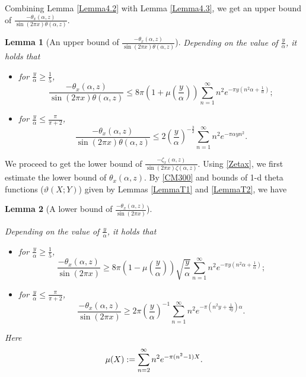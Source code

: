 \documentclass[reqno,english]{amsart}
\newtheorem{lemma}{Lemma}[section]
\newtheorem{open problem}{Open Problem}[section]
\newtheorem{open question}{Open Question}[section]
\newtheorem{open questions on hexagonal lattice}{Open Questions on hexagonal lattice}[section]
\begin{document}
Combining Lemma \ref{Lemma4.2} with Lemma \ref{Lemma4.3}, we get an upper bound of $\frac{-\theta_x(\alpha,z)}{\sin(2\pi x)\theta(\alpha,z)}$.
\begin{lemma}[An upper bound of $\frac{-\theta_x(\alpha,z)}{\sin(2\pi x)\theta(\alpha,z)}$]
\label{Lemma44KKK}
Depending on the value of $\frac{y}{\alpha}$, it holds that

\begin{itemize}
  \item for $\frac{y}{\alpha}\geq\frac{1}{5}$, $$\frac{-\theta_x(\alpha,z)}{\sin(2\pi x)\theta(\alpha,z)}\leq
8\pi(1+\mu(\frac{y}{\alpha}))\sum_{n=1}^\infty n^2 e^{-\pi y (n^2 \alpha+\frac{1}{\alpha})};$$
  \item for $\frac{y}{\alpha}\leq\frac{\pi}{\pi+2}$, $$\frac{-\theta_x(\alpha,z)}{\sin(2\pi x)\theta(\alpha,z)}\leq2(\frac{y}{\alpha})^{-\frac{3}{2}}\sum_{n=1}^\infty n^2 e^{-\pi\alpha y n^2}.$$
\end{itemize}




\end{lemma}

We proceed to get the lower bound of $\frac{-\zeta_x(\alpha,z)}{\sin(2\pi x)\zeta(\alpha,z)}$. Using \eqref{Zetax}, we first estimate the lower bound of $\theta_x(\alpha,z)$. By \eqref{CM300} and bounds of 1-d theta functions ($\vartheta(X;Y)$) given by Lemmas \ref{LemmaT1} and \ref{LemmaT2}, we have
\begin{lemma}[A lower bound of $\frac{-\theta_x(\alpha,z)}{\sin(2\pi x)}$]\label{Lemma43}

Depending on the value of $\frac{y}{\alpha}$, it holds that

\begin{itemize}
  \item for $\frac{y}{\alpha}\geq\frac{1}{5}$, $$\frac{-\theta_x(\alpha,z)}{\sin(2\pi x)}\geq
8\pi(1-\mu(\frac{y}{\alpha}))\sqrt{\frac{y}{\alpha}}\sum_{n=1}^\infty n^2 e^{-\pi y (n^2 \alpha+\frac{1}{\alpha})};$$
  \item for $\frac{y}{\alpha}\leq\frac{\pi}{\pi+2}$, $$\frac{-\theta_x(\alpha,z)}{\sin(2\pi x)}\geq2\pi(\frac{y}{\alpha})^{-1}\sum_{n=1}^\infty n^2 e^{-\pi (n^2 y +\frac{1}{4y})\alpha}.$$
\end{itemize}






Here
 \begin{equation}\aligned\nonumber
\mu(X):=\sum_{n=2}^\infty n^2 e^{-\pi (n^2-1)X}.
\endaligned\end{equation}
\end{lemma}
\end{document}
